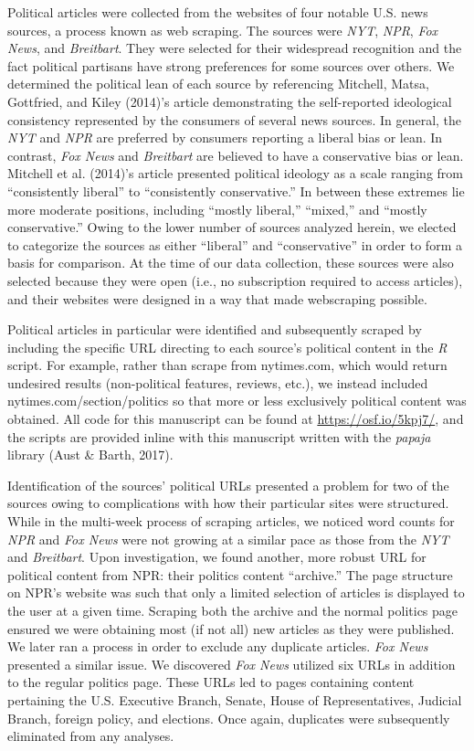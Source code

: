 \documentclass[
  man,floatsintext]{apa6}
\begin{document}
Political articles were collected from the websites of four notable U.S.
news sources, a process known as web scraping. The sources were \emph{NYT},
\emph{NPR}, \emph{Fox News}, and \emph{Breitbart}. They were selected for their
widespread recognition and the fact political partisans have strong
preferences for some sources over others. We determined the political
lean of each source by referencing Mitchell, Matsa, Gottfried, and Kiley (2014)'s article demonstrating
the self-reported ideological consistency represented by the consumers
of several news sources. In general, the \emph{NYT} and \emph{NPR} are preferred
by consumers reporting a liberal bias or lean. In contrast, \emph{Fox News}
and \emph{Breitbart} are believed to have a conservative bias or lean.
Mitchell et al. (2014)'s article presented political ideology as a scale ranging
from ``consistently liberal'' to ``consistently conservative.'' In between
these extremes lie more moderate positions, including ``mostly liberal,''
``mixed,'' and ``mostly conservative.'' Owing to the lower number of sources
analyzed herein, we elected to categorize the sources as either
``liberal'' and ``conservative'' in order to form a basis for comparison. At
the time of our data collection, these sources were also selected
because they were open (i.e., no subscription required to access
articles), and their websites were designed in a way that made
webscraping possible.

Political articles in particular were identified and subsequently
scraped by including the specific URL directing to each source's
political content in the \emph{R} script. For example, rather than scrape
from nytimes.com, which would return undesired results (non-political
features, reviews, etc.), we instead included
nytimes.com/section/politics so that more or less exclusively political
content was obtained. All code for this manuscript can be found at
\url{https://osf.io/5kpj7/}, and the scripts are provided inline with this
manuscript written with the \emph{papaja} library (Aust \& Barth, 2017).

Identification of the sources' political URLs presented a problem for
two of the sources owing to complications with how their particular
sites were structured. While in the multi-week process of scraping
articles, we noticed word counts for \emph{NPR} and \emph{Fox News} were not
growing at a similar pace as those from the \emph{NYT} and \emph{Breitbart}. Upon
investigation, we found another, more robust URL for political content
from NPR: their politics content ``archive.'' The page structure on NPR's
website was such that only a limited selection of articles is displayed
to the user at a given time. Scraping both the archive and the normal
politics page ensured we were obtaining most (if not all) new articles
as they were published. We later ran a process in order to exclude any
duplicate articles. \emph{Fox News} presented a similar issue. We discovered
\emph{Fox News} utilized six URLs in addition to the regular politics page.
These URLs led to pages containing content pertaining the U.S. Executive
Branch, Senate, House of Representatives, Judicial Branch, foreign
policy, and elections. Once again, duplicates were subsequently
eliminated from any analyses.
\end{document}
